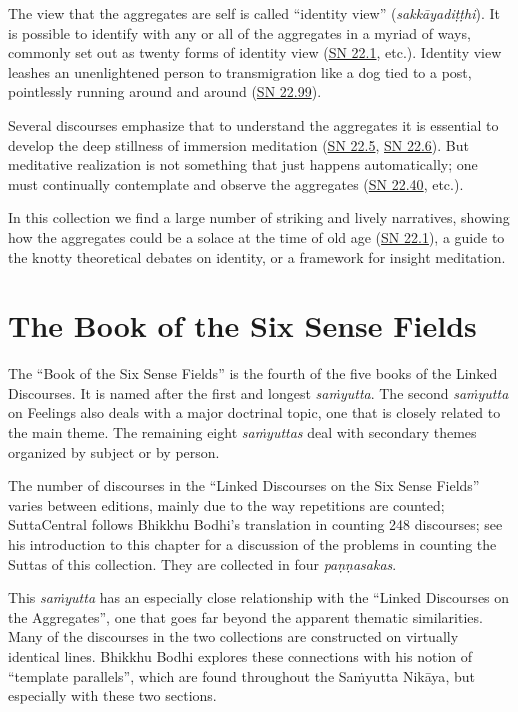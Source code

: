 \documentclass[12pt,openany]{book}%
\begin{document}
The view that the aggregates are self is called “identity view” (\textit{\textsanskrit{sakkāyadiṭṭhi}}). It is possible to identify with any or all of the aggregates in a myriad of ways, commonly set out as twenty forms of identity view (\href{https://suttacentral.net/sn22.1}{SN 22.1}, etc.). Identity view leashes an unenlightened person to transmigration like a dog tied to a post, pointlessly running around and around (\href{https://suttacentral.net/sn22.99}{SN 22.99}).

Several discourses emphasize that to understand the aggregates it is essential to develop the deep stillness of immersion meditation (\href{https://suttacentral.net/sn22.5}{SN 22.5}, \href{https://suttacentral.net/sn22.6}{SN 22.6}). But meditative realization is not something that just happens automatically; one must continually contemplate and observe the aggregates (\href{https://suttacentral.net/sn22.40}{SN 22.40}, etc.).

In this collection we find a large number of striking and lively narratives, showing how the aggregates could be a solace at the time of old age (\href{https://suttacentral.net/sn22.1}{SN 22.1}), a guide to the knotty theoretical debates on identity, or a framework for insight meditation.

\section*{The Book of the Six Sense Fields}

The “Book of the Six Sense Fields” is the fourth of the five books of the Linked Discourses. It is named after the first and longest \textit{\textsanskrit{saṁyutta}}. The second \textit{\textsanskrit{saṁyutta}} on Feelings also deals with a major doctrinal topic, one that is closely related to the main theme. The remaining eight \textit{\textsanskrit{saṁyuttas}} deal with secondary themes organized by subject or by person.

The number of discourses in the “Linked Discourses on the Six Sense Fields” varies between editions, mainly due to the way repetitions are counted; SuttaCentral follows Bhikkhu Bodhi’s translation in counting 248 discourses; see his introduction to this chapter for a discussion of the problems in counting the Suttas of this collection. They are collected in four \textit{\textsanskrit{paṇṇasakas}}.

This \textit{\textsanskrit{saṁyutta}} has an especially close relationship with the “Linked Discourses on the Aggregates”, one that goes far beyond the apparent thematic similarities. Many of the discourses in the two collections are constructed on virtually identical lines. Bhikkhu Bodhi explores these connections with his notion of “template parallels”, which are found throughout the \textsanskrit{Saṁyutta} \textsanskrit{Nikāya}, but especially with these two sections.
\end{document}
